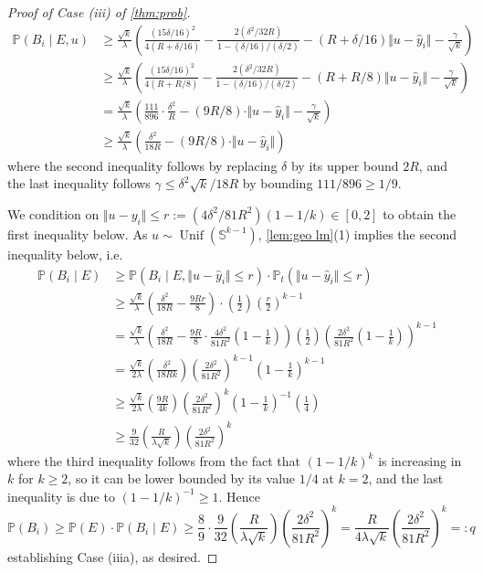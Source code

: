 \documentclass[aoap]{imsart}
\numberwithin{equation}{section}
\theoremstyle{definition}
\theoremstyle{remark}
\renewcommand{\hat}{\widehat}
\numberwithin{equation}{section}
\renewcommand{\S}{\mathbb{S}}
\newcommand{\0}{\mathbf{0}}
\newcommand{\1}{\mathbf{1}}
\renewcommand{\P}{\mathbb{P}}
\renewcommand{\S}{\mathbb{S}}
\DeclareMathOperator{\Unif}{Unif}
\numberwithin{equation}{section}
\begin{document}
\begin{proof}[Proof of Case (iii) of \cref{thm:prob}]
\begin{align*}
\P(B_{i}\mid E, u) & \geq \frac{\sqrt{k}}{\lambda}\left(\frac{(15\delta/16)^2}{4(R+\delta/16)} -\frac{2 (\delta^2/32R)}{1-(\delta/16)/(\delta/2)}  - (R+\delta/16)\Vert u-\hat{y}_{i}\Vert - \frac{\gamma}{\sqrt{k}}\right)
\\ & \geq \frac{\sqrt{k}}{\lambda}\left(\frac{(15\delta/16)^2}{4(R+R/8)} -\frac{2(\delta^2/32R)}{1-(\delta/16)/(\delta/2)}  - (R+R/8)\Vert u-\hat{y}_{i}\Vert - \frac{\gamma}{\sqrt{k}}\right) 
\\ & = \frac{\sqrt{k}}{\lambda}\left(\frac{111}{896}\cdot\frac{\delta^2}{R} - (9R/8)\cdot\Vert u-\hat{y}_{i}\Vert - \frac{\gamma}{\sqrt{k}}\right) 
\\ & \geq \frac{\sqrt{k}}{\lambda}\left(\frac{\delta^2}{18R} - (9R/8)\cdot\Vert u-\hat{y}_{i}\Vert\right) 
\end{align*}
where the second inequality follows by replacing $\delta$ by its upper bound $2R$, and the last inequality follows $\gamma \leq \delta^2\sqrt{k}/18R$ by bounding $111/896\geq 1/9$.

We condition on $\Vert u-y_i\Vert \leq r:=(4\delta^{2}/81R^{2})(1-1/k)\in [0, 2]$ to obtain the first inequality below. As $u\sim \Unif(\S^{k-1})$, \cref{lem:geo lm}(1) implies the second inequality below, i.e.
\begin{align*}
\P(B_{i}\mid E) & \geq\P\left(B_{i}\mid E, \Vert u-\hat{y}_{i}\Vert \leq r\right)\cdot \P_{t}\left(\Vert u-\hat{y}_{i}\Vert \leq r\right)
\\ & \geq \frac{\sqrt{k}}{\lambda}\left(\frac{\delta^2}{18R} - \frac{9Rr}{8}\right) \cdot \left(\frac{1}{2}\right)\left(\frac{r}{2}\right)^{k-1}
\\ & = \frac{\sqrt{k}}{\lambda}\left(\frac{\delta^2}{18R} - \frac{9R}{8}\cdot \frac{4\delta^2}{81R^2}\left(1-\frac{1}{k}\right)\right) \left(\frac{1}{2}\right)\left(\frac{2\delta^2}{81R^2}\left(1-\frac{1}{k}\right)\right)^{k-1}
\\ & = \frac{\sqrt{k}}{2\lambda}\left(\frac{\delta^2}{18Rk}\right) \left(\frac{2\delta^2}{81R^2}\right)^{k-1}\left(1-\frac{1}{k}\right)^{k-1}
\\ & \geq \frac{\sqrt{k}}{2\lambda}\left(\frac{9R}{4k}\right) \left(\frac{2\delta^2}{81R^2}\right)^{k}\left(1-\frac{1}{k}\right)^{-1}\left(\frac{1}{4}\right)
\\ & \geq  \frac{9}{32}\left(\frac{R}{\lambda\sqrt{k}}\right) \left(\frac{2\delta^2}{81R^2}\right)^{k}
\end{align*}
where the third inequality follows from the fact that $(1-1/k)^k$ is increasing in $k$ for $k\geq 2$, so it can be lower bounded by its value $1/4$ at $k=2$, and the last inequality is due to $(1-1/k)^{-1}\geq 1$. Hence
\[\P(B_i)\geq \P(E)\cdot \P(B_i\mid E) \geq \frac{8}{9}\cdot \frac{9}{32}\left(\frac{R}{\lambda\sqrt{k}}\right) \left(\frac{2\delta^2}{81R^2}\right)^{k} = \frac{R}{4\lambda\sqrt{k}} \left(\frac{2\delta^2}{81R^2}\right)^{k} =:q \]
establishing Case (iiia), as desired.


\end{proof}
\end{document}
